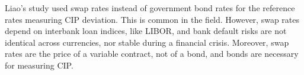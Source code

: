 
Liao's study used swap rates instead of government bond rates for the reference rates measuring CIP deviation.  This is common in the field\cite{Du2017,Borio2016,Avdjiev2016}.  However, swap rates depend on interbank loan indices, like LIBOR, and bank default risks are not identical across currencies, nor stable during a financial crisis.  Moreover, swap rates are the price of a variable contract, not of a bond, and bonds are necessary for measuring CIP.






